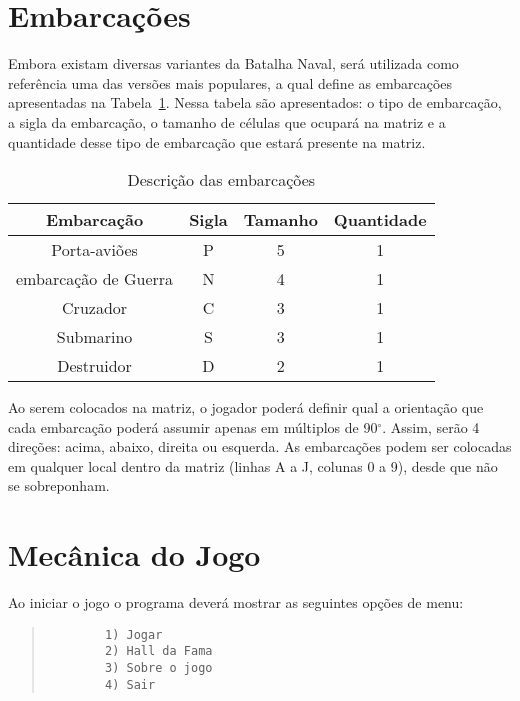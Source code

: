 \documentclass[defesa,oneside]{ppginf}
\begin{document}
\section{Embarcações}

Embora existam diversas variantes da Batalha Naval, será utilizada como referência uma das versões mais populares, a qual define as embarcações apresentadas na Tabela~\ref{tab:embarcações}. Nessa tabela são apresentados: o tipo de embarcação, a sigla da embarcação, o tamanho de células que ocupará na matriz e a quantidade desse tipo de embarcação que estará presente na matriz.

\begin{table}[!htbp]
	\centering
	\caption{Descrição das embarcações}
	\label{tab:embarcações}
	\begin{tabular}{c|c|c|c}
		\hline
		\textbf{Embarcação} & \textbf{Sigla} & \textbf{Tamanho} & \textbf{Quantidade} \\ \hline
		   Porta-aviões     &       P        &        5         &          1          \\ \hline
		  embarcação de Guerra   &       N        &        4         &          1          \\ \hline
		     Cruzador       &       C        &        3         &          1          \\ \hline
		     Submarino      &       S        &        3         &          1          \\ \hline
		    Destruidor      &       D        &        2         &          1          \\ \hline
	\end{tabular}
\end{table}


Ao serem colocados na matriz, o jogador poderá definir qual a orientação que cada embarcação poderá assumir apenas em múltiplos de 90$^{\circ}$. Assim, serão 4 direções: acima, abaixo, direita ou esquerda. As embarcações podem ser colocadas em qualquer local dentro da matriz (linhas A a J, colunas 0 a 9), desde que não se sobreponham.

\section{Mecânica do Jogo}

Ao iniciar o jogo o programa deverá mostrar as seguintes opções de menu:

\begin{quote}
	\begin{footnotesize}
		\begin{verbatim}
		1) Jogar
		2) Hall da Fama
		3) Sobre o jogo
		4) Sair
		\end{verbatim}		
	\end{footnotesize}
\end{quote}
\end{document}
